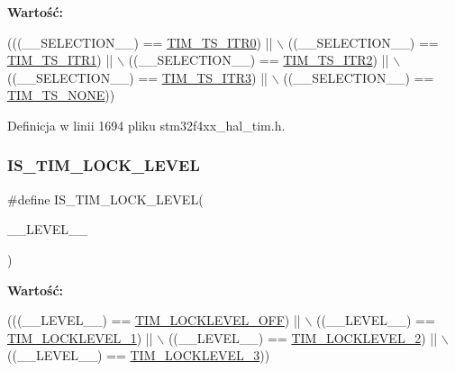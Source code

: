 {\bfseries Wartość\+:}
\begin{DoxyCode}
(((\_\_SELECTION\_\_) == \hyperlink{group___t_i_m___trigger___selection_gab7cf2b7db3956d4fd1e5a5d84f4891e7}{TIM\_TS\_ITR0}) || \(\backslash\)
                                                               ((\_\_SELECTION\_\_) == 
      \hyperlink{group___t_i_m___trigger___selection_gad90fbca297153ca9c0112a67ea2c6cb3}{TIM\_TS\_ITR1}) || \(\backslash\)
                                                               ((\_\_SELECTION\_\_) == 
      \hyperlink{group___t_i_m___trigger___selection_ga8599ba58a5f911d648503c7ac55d4320}{TIM\_TS\_ITR2}) || \(\backslash\)
                                                               ((\_\_SELECTION\_\_) == 
      \hyperlink{group___t_i_m___trigger___selection_ga63183e611b91c5847040172c0069514d}{TIM\_TS\_ITR3}) || \(\backslash\)
                                                               ((\_\_SELECTION\_\_) == 
      \hyperlink{group___t_i_m___trigger___selection_ga257bee9dc9f2f71a73124dd8c2329480}{TIM\_TS\_NONE}))
\end{DoxyCode}


Definicja w linii 1694 pliku stm32f4xx\+\_\+hal\+\_\+tim.\+h.

\mbox{\label{group___t_i_m___private___macros_gad53d9e9b4fa060db29f3900b3dfcb3ed}} 
\subsubsection{\texorpdfstring{I\+S\+\_\+\+T\+I\+M\+\_\+\+L\+O\+C\+K\+\_\+\+L\+E\+V\+EL}{IS\_TIM\_LOCK\_LEVEL}}
{\footnotesize\ttfamily \#define I\+S\+\_\+\+T\+I\+M\+\_\+\+L\+O\+C\+K\+\_\+\+L\+E\+V\+EL(\begin{DoxyParamCaption}\item[{}]{\+\_\+\+\_\+\+L\+E\+V\+E\+L\+\_\+\+\_\+ }\end{DoxyParamCaption})}

{\bfseries Wartość\+:}
\begin{DoxyCode}
(((\_\_LEVEL\_\_) == \hyperlink{group___t_i_m___lock__level_ga304aece56a9391a4d9b1016144d98fbd}{TIM\_LOCKLEVEL\_OFF}) || \(\backslash\)
                                            ((\_\_LEVEL\_\_) == \hyperlink{group___t_i_m___lock__level_ga46dc7705788ba2ce5135c43b998ef4dd}{TIM\_LOCKLEVEL\_1})   || \(\backslash\)
                                            ((\_\_LEVEL\_\_) == \hyperlink{group___t_i_m___lock__level_ga03a5ed2aded43ccfe7ab12a9dd53d251}{TIM\_LOCKLEVEL\_2})   || \(\backslash\)
                                            ((\_\_LEVEL\_\_) == \hyperlink{group___t_i_m___lock__level_gaa1afed375c27151608e388fdf4a57a13}{TIM\_LOCKLEVEL\_3}))
\end{DoxyCode}


